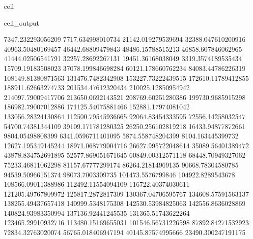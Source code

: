 \documentclass[letterpaper,10pt,english]{jupyterBook}
\begin{document}
\begin{sphinxuseclass}{cell}
\begin{sphinxVerbatimOutput}
\begin{sphinxuseclass}{cell_output}
\begin{sphinxVerbatim}[commandchars=\\\{\}]
7347.232293056209  \PYGZhy{}7717.634998010734  \PYGZhy{}21142.019279539694  \PYGZhy{}32388.047610200916  \PYGZhy{}40963.50480169457  \PYGZhy{}46442.68809479843  \PYGZhy{}48486.15788515213  \PYGZhy{}46858.607846062965  \PYGZhy{}41444.02506541791  \PYGZhy{}32257.28692267131  \PYGZhy{}19451.36168038049  \PYGZhy{}3319.3574189535434  15709.19183508023  37078.199846698284  60121.178660762234  84083.44786226319  108149.81380871563  131476.7482342908  153227.73222439515  172610.11789412855  188911.62663274733  201534.47612320434  210025.12850954942  214097.79009417706  213650.0692143521  208769.60251280386  199730.9685915298  186982.79007012886  171125.54075881466  152881.17974081042  133056.28324130864  112500.79545936665  92064.83454333595  72556.14258032547  54700.74381344109  39109.171781280325  26250.256102819218  16433.94877872661  9804.05498808399  6341.0596711401095  5874.558748204399  8104.163445399732  12627.195349145244  18971.068779004716  26627.995722048614  35089.56401389472  43878.834752691895  52577.869051671645  60849.00312571118  68448.70949327062  75233.46811062298  81157.67777299174  86264.21814969135  90668.78304580785  94539.50966151374  98073.7003309735  101473.5576799846  104922.8289543678  108566.09011388986  112492.11554094109  116722.40374030611  121205.49767809972  125817.2872817309  130367.04706595767  134608.57591563137  138255.49437657418  140999.5348175308  142530.53984825063  142556.8636028869  140824.93983350994  137136.92441245535  131365.51743622264  123465.29910932716  113480.15169655031  101546.56731226598  87892.84271532923  72834.32763020074  56765.018406947194  40145.87574995666  23490.300247191175  

\end{sphinxVerbatim}
\end{sphinxuseclass}
\end{sphinxVerbatimOutput}
\end{sphinxuseclass}
\end{document}

